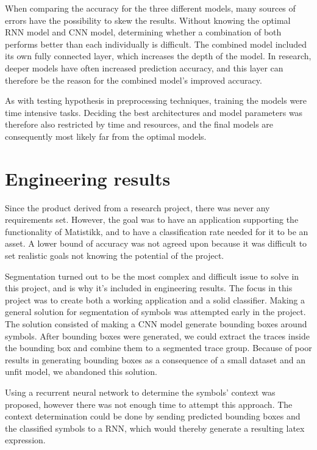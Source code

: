 When comparing the accuracy for the three different models, many sources of errors have the possibility to skew the results. Without knowing the optimal RNN model and CNN model, determining whether a combination of both performs better than each individually is difficult. The combined model included its own fully connected layer, which increases the depth of the model. In research, deeper models have often increased prediction accuracy, and this layer can therefore be the reason for the combined model's improved accuracy.

As with testing hypothesis in preprocessing techniques, training the models were time intensive tasks. Deciding the best architectures and model parameters was therefore also restricted by time and resources, and the final models are consequently most likely far from the optimal models.


\section{Engineering results}
\label{engineering_results}


Since the product derived from a research project, there was never any requirements set. However, the goal was to have an application supporting the functionality of Matistikk, and to have a classification rate needed for it to be an asset. A lower bound of accuracy was not agreed upon because it was difficult to set realistic goals not knowing the potential of the project. 

Segmentation turned out to be the most complex and difficult issue to solve in this project, and is why it's included in engineering results. The focus in this project was to create both a working application and a solid classifier. Making a general solution for segmentation of symbols was attempted early in the project. The solution consisted of making a CNN model generate bounding boxes around symbols. After bounding boxes were generated, we could extract the traces inside the bounding box and combine them to a segmented trace group. Because of poor results in generating bounding boxes as a consequence of a small dataset and an unfit model, we abandoned this solution.

Using a recurrent neural network to determine the symbols' context was proposed, however there was not enough time to attempt this approach. The context determination could be done by sending predicted bounding boxes and the classified symbols to a RNN, which would thereby generate a resulting latex expression. 

